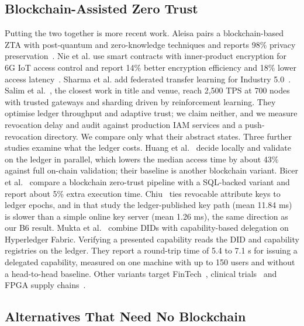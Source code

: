 \documentclass[a4paper,5p,times,twocolumn,number,sort&compress]{elsarticle}
\begin{document}
\subsection{Blockchain-Assisted Zero Trust}

Putting the two together is more recent work. Aleisa pairs a blockchain-based ZTA with post-quantum and zero-knowledge techniques and reports 98\% privacy preservation~\cite{aleisa}. Nie et al. use smart contracts with inner-product encryption for 6G IoT access control and report 14\% better encryption efficiency and 18\% lower access latency~\cite{nie}. Sharma et al. add federated transfer learning for Industry 5.0~\cite{sharma}. Salim et al.~\cite{salim}, the closest work in title and venue, reach 2,500 TPS at 700 nodes with trusted gateways and sharding driven by reinforcement learning. They optimise ledger throughput and adaptive trust; we claim neither, and we measure revocation delay and audit against production IAM services and a push-revocation directory. We compare only what their abstract states. Three further studies examine what the ledger costs. Huang et al.~\cite{huang24} decide locally and validate on the ledger in parallel, which lowers the median access time by about 43\% against full on-chain validation; their baseline is another blockchain variant. Bicer et al.~\cite{bicer23} compare a blockchain zero-trust pipeline with a SQL-backed variant and report about 5\% extra execution time. Chiu~\cite{chiu26} ties revocable attribute keys to ledger epochs, and in that study the ledger-published key path (mean 11.84 ms) is slower than a simple online key server (mean 1.26 ms), the same direction as our B6 result. Mukta et al.~\cite{mukta} combine DIDs with capability-based delegation on Hyperledger Fabric. Verifying a presented capability reads the DID and capability registries on the ledger. They report a round-trip time of 5.4 to 7.1 s for issuing a delegated capability, measured on one machine with up to 150 users and without a head-to-head baseline. Other variants target FinTech~\cite{singh}, clinical trials~\cite{peepliwal} and FPGA supply chains~\cite{kulkarni}.

\subsection{Alternatives That Need No Blockchain}
\end{document}
